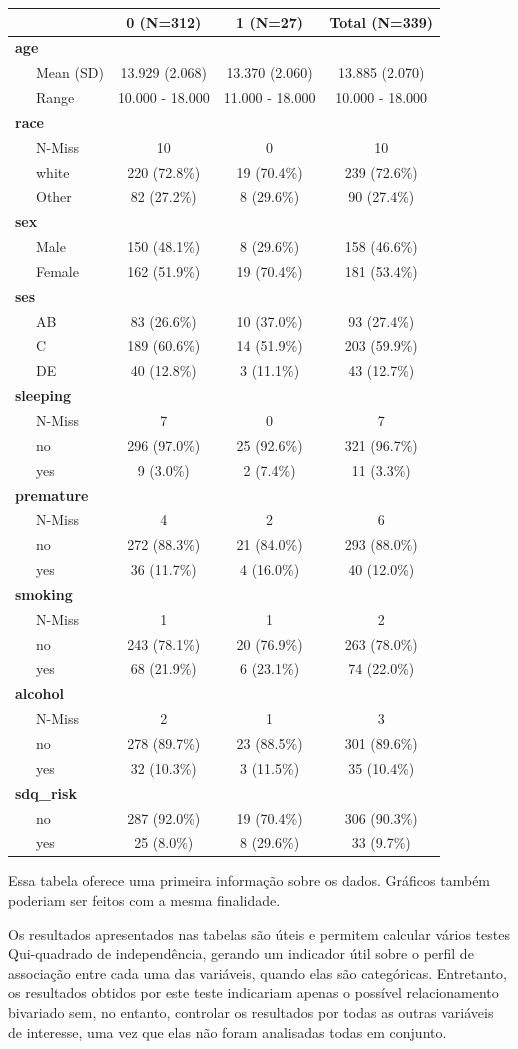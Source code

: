 \documentclass[
]{book}
\begin{document}
\begin{longtable}[]{@{}lccc@{}}
\toprule
& 0 (N=312) & 1 (N=27) & Total (N=339)\tabularnewline
\midrule
\endhead
\textbf{age} & & &\tabularnewline
~~~Mean (SD) & 13.929 (2.068) & 13.370 (2.060) & 13.885
(2.070)\tabularnewline
~~~Range & 10.000 - 18.000 & 11.000 - 18.000 & 10.000 -
18.000\tabularnewline
\textbf{race} & & &\tabularnewline
~~~N-Miss & 10 & 0 & 10\tabularnewline
~~~white & 220 (72.8\%) & 19 (70.4\%) & 239 (72.6\%)\tabularnewline
~~~Other & 82 (27.2\%) & 8 (29.6\%) & 90 (27.4\%)\tabularnewline
\textbf{sex} & & &\tabularnewline
~~~Male & 150 (48.1\%) & 8 (29.6\%) & 158 (46.6\%)\tabularnewline
~~~Female & 162 (51.9\%) & 19 (70.4\%) & 181 (53.4\%)\tabularnewline
\textbf{ses} & & &\tabularnewline
~~~AB & 83 (26.6\%) & 10 (37.0\%) & 93 (27.4\%)\tabularnewline
~~~C & 189 (60.6\%) & 14 (51.9\%) & 203 (59.9\%)\tabularnewline
~~~DE & 40 (12.8\%) & 3 (11.1\%) & 43 (12.7\%)\tabularnewline
\textbf{sleeping} & & &\tabularnewline
~~~N-Miss & 7 & 0 & 7\tabularnewline
~~~no & 296 (97.0\%) & 25 (92.6\%) & 321 (96.7\%)\tabularnewline
~~~yes & 9 (3.0\%) & 2 (7.4\%) & 11 (3.3\%)\tabularnewline
\textbf{premature} & & &\tabularnewline
~~~N-Miss & 4 & 2 & 6\tabularnewline
~~~no & 272 (88.3\%) & 21 (84.0\%) & 293 (88.0\%)\tabularnewline
~~~yes & 36 (11.7\%) & 4 (16.0\%) & 40 (12.0\%)\tabularnewline
\textbf{smoking} & & &\tabularnewline
~~~N-Miss & 1 & 1 & 2\tabularnewline
~~~no & 243 (78.1\%) & 20 (76.9\%) & 263 (78.0\%)\tabularnewline
~~~yes & 68 (21.9\%) & 6 (23.1\%) & 74 (22.0\%)\tabularnewline
\textbf{alcohol} & & &\tabularnewline
~~~N-Miss & 2 & 1 & 3\tabularnewline
~~~no & 278 (89.7\%) & 23 (88.5\%) & 301 (89.6\%)\tabularnewline
~~~yes & 32 (10.3\%) & 3 (11.5\%) & 35 (10.4\%)\tabularnewline
\textbf{sdq\_risk} & & &\tabularnewline
~~~no & 287 (92.0\%) & 19 (70.4\%) & 306 (90.3\%)\tabularnewline
~~~yes & 25 (8.0\%) & 8 (29.6\%) & 33 (9.7\%)\tabularnewline
\bottomrule
\end{longtable}

Essa tabela oferece uma primeira informação sobre os dados. Gráficos
também poderiam ser feitos com a mesma finalidade.

Os resultados apresentados nas tabelas são úteis e permitem calcular
vários testes Qui-quadrado de independência, gerando um indicador útil
sobre o perfil de associação entre cada uma das variáveis, quando elas
são categóricas. Entretanto, os resultados obtidos por este teste
indicariam apenas o possível relacionamento bivariado sem, no entanto,
controlar os resultados por todas as outras variáveis de interesse, uma
vez que elas não foram analisadas todas em conjunto.
\end{document}

